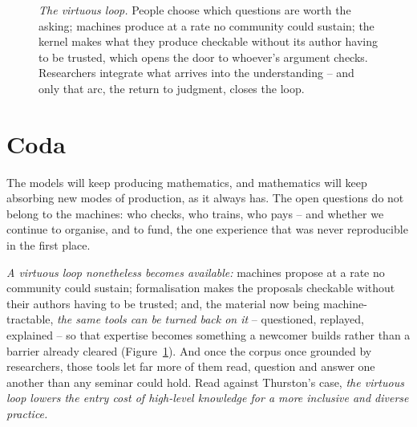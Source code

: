 \documentclass[11pt, a4paper,twosided]{amsart}
\begin{document}
\begin{figure}[h]
\centering
{}
\caption{\emph{The virtuous loop.} People choose which questions are worth the asking; machines produce at a rate no community could sustain; the kernel makes what they produce checkable without its author having to be trusted, which opens the door to whoever's argument checks. Researchers integrate what arrives into the understanding -- and only that arc, the return to judgment, closes the loop.}
\label{fig:virtuous}
\end{figure}

\section*{Coda}

The models will keep producing mathematics, and mathematics will keep absorbing new modes of production, as it always has. The open questions do not belong to the machines: who checks, who trains, who pays -- and whether we continue to organise, and to fund, the one experience that was never reproducible in the first place.


\emph{A virtuous loop nonetheless becomes available:} machines propose at a rate no community could sustain; formalisation makes the proposals checkable without their authors having to be trusted; and, the material now being machine-tractable, \emph{the same tools can be turned back on it} -- questioned, replayed, explained -- so that expertise becomes something a newcomer builds rather than a barrier already cleared (Figure~\ref{fig:virtuous}). And once the corpus once grounded by researchers, those tools let far more of them read, question and answer one another than any seminar could hold. Read against Thurston's case, \emph{the virtuous loop lowers the entry cost of high-level knowledge for a more inclusive and diverse practice.}
\end{document}
